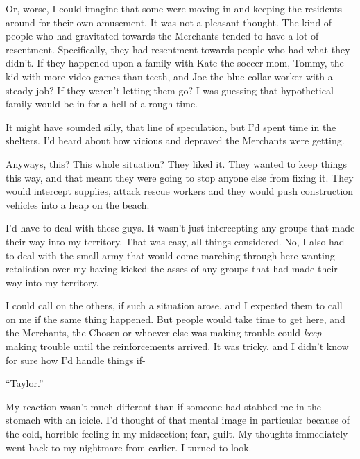 Or, worse, I could imagine that some were moving in and keeping the residents around for their own amusement.  It was not a pleasant thought.  The kind of people who had gravitated towards the Merchants tended to have a lot of resentment.  Specifically, they had resentment towards people who had what they didn't.  If they happened upon a family with Kate the soccer mom, Tommy, the kid with more video games than teeth, and Joe the blue-collar worker with a steady job?  If they weren't letting them go?  I was guessing that hypothetical family would be in for a hell of a rough time.



It might have sounded silly, that line of speculation, but I'd spent time in the shelters.  I'd heard about how vicious and depraved the Merchants were getting.



Anyways, this?  This whole situation?  They liked it.  They wanted to keep things this way, and that meant they were going to stop anyone else from fixing it.  They would intercept supplies, attack rescue workers and they would push construction vehicles into a heap on the beach.



I'd have to deal with these guys.  It wasn't just intercepting any groups that made their way into my territory.  That was easy, all things considered.  No, I also had to deal with the small army that would come marching through here wanting retaliation over my having kicked the asses of any groups that had made their way into my territory.



I could call on the others, if such a situation arose, and I expected them to call on me if the same thing happened.  But people would take time to get here, and the Merchants, the Chosen or whoever else was making trouble could \emph{keep} making trouble until the reinforcements arrived.  It was tricky, and I didn't know for sure how I'd handle things if-



``Taylor.''



My reaction wasn't much different than if someone had stabbed me in the stomach with an icicle.  I'd thought of that mental image in particular because of the cold, horrible feeling in my midsection; fear, guilt.  My thoughts immediately went back to my nightmare from earlier.  I turned to look.



